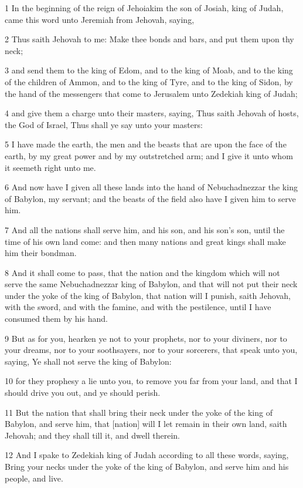 \par 1 In the beginning of the reign of Jehoiakim the son of Josiah, king of Judah, came this word unto Jeremiah from Jehovah, saying,
\par 2 Thus saith Jehovah to me: Make thee bonds and bars, and put them upon thy neck;
\par 3 and send them to the king of Edom, and to the king of Moab, and to the king of the children of Ammon, and to the king of Tyre, and to the king of Sidon, by the hand of the messengers that come to Jerusalem unto Zedekiah king of Judah;
\par 4 and give them a charge unto their masters, saying, Thus saith Jehovah of hosts, the God of Israel, Thus shall ye say unto your masters:
\par 5 I have made the earth, the men and the beasts that are upon the face of the earth, by my great power and by my outstretched arm; and I give it unto whom it seemeth right unto me.
\par 6 And now have I given all these lands into the hand of Nebuchadnezzar the king of Babylon, my servant; and the beasts of the field also have I given him to serve him.
\par 7 And all the nations shall serve him, and his son, and his son's son, until the time of his own land come: and then many nations and great kings shall make him their bondman.
\par 8 And it shall come to pass, that the nation and the kingdom which will not serve the same Nebuchadnezzar king of Babylon, and that will not put their neck under the yoke of the king of Babylon, that nation will I punish, saith Jehovah, with the sword, and with the famine, and with the pestilence, until I have consumed them by his hand.
\par 9 But as for you, hearken ye not to your prophets, nor to your diviners, nor to your dreams, nor to your soothsayers, nor to your sorcerers, that speak unto you, saying, Ye shall not serve the king of Babylon:
\par 10 for they prophesy a lie unto you, to remove you far from your land, and that I should drive you out, and ye should perish.
\par 11 But the nation that shall bring their neck under the yoke of the king of Babylon, and serve him, that [nation] will I let remain in their own land, saith Jehovah; and they shall till it, and dwell therein.
\par 12 And I spake to Zedekiah king of Judah according to all these words, saying, Bring your necks under the yoke of the king of Babylon, and serve him and his people, and live.
